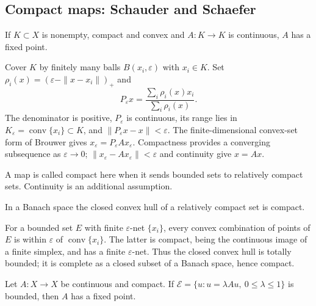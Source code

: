 \Needspace{42mm}

\Needspace{70mm}
\subsection{Compact maps: Schauder and Schaefer}
\Needspace{50mm}
\begin{theorem}
If $K\subset X$ is nonempty, compact and convex and $A:K\to K$ is
continuous, $A$ has a fixed point.
\end{theorem}
\begin{expandedproof}
Cover $K$ by finitely many balls $B(x_i,\varepsilon)$ with $x_i\in K$.
Set $\rho_i(x)=(\varepsilon-\|x-x_i\|)_+$ and
\[
 P_\varepsilon x=\frac{\sum_i\rho_i(x)x_i}{\sum_i\rho_i(x)}.
\]
The denominator is positive, $P_\varepsilon$ is continuous, its range
lies in $K_\varepsilon=\operatorname{conv}\{x_i\}\subset K$, and
$\|P_\varepsilon x-x\|<\varepsilon$. The finite-dimensional convex-set
form of Brouwer gives $x_\varepsilon=P_\varepsilon Ax_\varepsilon$.
Compactness provides a converging subsequence as $\varepsilon\to0$;
$\|x_\varepsilon-Ax_\varepsilon\|<\varepsilon$ and continuity give $x=Ax$.
\end{expandedproof}
A map is called compact here when it sends bounded sets to relatively
compact sets. Continuity is an additional assumption.
\Needspace{50mm}
\begin{lemma}
In a Banach space the closed convex hull of a relatively compact set is compact.
\end{lemma}
\begin{expandedproof}
For a bounded set $E$ with finite $\varepsilon$-net $\{x_i\}$, every convex
combination of points of $E$ is within $\varepsilon$ of
$\operatorname{conv}\{x_i\}$. The latter is compact, being the continuous
image of a finite simplex, and has a finite $\varepsilon$-net. Thus the
closed convex hull is totally bounded; it is complete as a closed subset
of a Banach space, hence compact.
\end{expandedproof}
\Needspace{50mm}
\begin{theorem}
Let $A:X\to X$ be continuous and compact. If
$\mathcal E=\{u:u=\lambda Au,\ 0\leq\lambda\leq1\}$ is bounded,
then $A$ has a fixed point.
\end{theorem}
